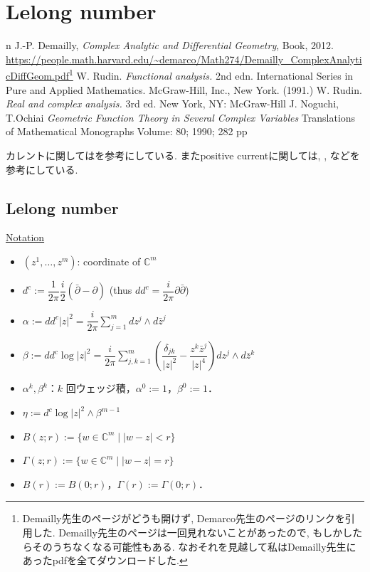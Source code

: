 \chapter{Lelong number}

\begin{thebibliography}{n}
J.-P. Demailly,
\textit{Complex Analytic and Differential Geometry},
Book, 2012.
\url{https://people.math.harvard.edu/~demarco/Math274/Demailly_ComplexAnalyticDiffGeom.pdf}\footnote{Demailly先生のページがどうも開けず, Demarco先生のページのリンクを引用した. Demailly先生のページは一回見れないことがあったので, もしかしたらそのうちなくなる可能性もある. なおそれを見越して私はDemailly先生にあったpdfを全てダウンロードした.}
W. Rudin. \textit{Functional analysis.} 2nd edn. International Series in Pure and Applied Mathematics. McGraw-Hill, Inc., New York. (1991.)
W. Rudin. \textit{Real and complex analysis. } 3rd ed. New York, NY: McGraw-Hill 
J. Noguchi, T.Ochiai \textit{Geometric Function Theory in Several Complex Variables} Translations of Mathematical Monographs
Volume: 80; 1990; 282 pp
\end{thebibliography}
 
カレントに関しては\cite[Chapter 3]{NO}を参考にしている. 
またpositive currentに関しては, 
\cite[Chapter 1. Section 3.C]{Dem}, \cite[Chapter 3. Section 1.]{Dem}
などを参考にしている. 

\section{Lelong number}

\underline{Notation}
\begin{itemize}
\item $(z^1,\ldots,z^m)$: coordinate of $\mathbb{C}^m$
\item $d^c:=\dfrac{1}{2\pi}\dfrac{i}{2}(\bar{\partial}-\partial)$ \quad (thus $dd^c=\dfrac{i}{2\pi}\partial\bar{\partial}$)
\item $\alpha:=dd^c|z|^2=\dfrac{i}{2\pi}\displaystyle\sum_{j=1}^m dz^j\wedge d\bar{z}^j$
\item $\beta:=dd^c\log|z|^2=\dfrac{i}{2\pi}\displaystyle\sum_{j,k=1}^m\left(\dfrac{\delta_{jk}}{|z|^2}-\dfrac{z^k\bar{z}^j}{|z|^4}\right)dz^j\wedge d\bar{z}^k$
\item $\alpha^k,\beta^k$：$k$ 回ウェッジ積，$\alpha^0:=1$，$\beta^0:=1$．
\item $\eta:=d^c\log|z|^2\wedge\beta^{m-1}$
\item $B(z;r):=\{w\in\mathbb{C}^m\mid |w-z|<r\}$
\item $\Gamma(z;r):=\{w\in\mathbb{C}^m\mid |w-z|=r\}$
\item $B(r):=B(0;r)$，$\Gamma(r):=\Gamma(0;r)$．
\end{itemize}

